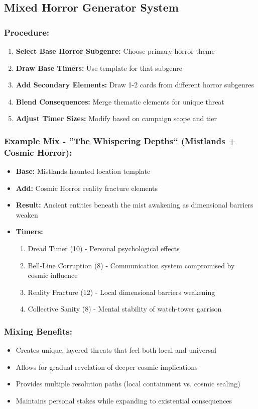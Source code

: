 \documentclass[11pt]{article}
\begin{document}
\subsection{Mixed Horror Generator System}

\subsubsection{Procedure:}
\begin{enumerate}
\item \textbf{Select Base Horror Subgenre:} Choose primary horror theme
\item \textbf{Draw Base Timers:} Use template for that subgenre
\item \textbf{Add Secondary Elements:} Draw 1-2 cards from different horror subgenres
\item \textbf{Blend Consequences:} Merge thematic elements for unique threat
\item \textbf{Adjust Timer Sizes:} Modify based on campaign scope and tier
\end{enumerate}

\subsubsection{Example Mix - ''The Whispering Depths`` (Mistlands + Cosmic Horror):}
\begin{itemize}
\item \textbf{Base:} Mistlands haunted location template
\item \textbf{Add:} Cosmic Horror reality fracture elements
\item \textbf{Result:} Ancient entities beneath the mist awakening as dimensional barriers weaken
\item \textbf{Timers:}
  \begin{enumerate}
  \item Dread Timer (10) - Personal psychological effects
  \item Bell-Line Corruption (8) - Communication system compromised by cosmic influence
  \item Reality Fracture (12) - Local dimensional barriers weakening
  \item Collective Sanity (8) - Mental stability of watch-tower garrison
  \end{enumerate}
\end{itemize}

\subsubsection{Mixing Benefits:}
\begin{itemize}
\item Creates unique, layered threats that feel both local and universal
\item Allows for gradual revelation of deeper cosmic implications
\item Provides multiple resolution paths (local containment vs. cosmic sealing)
\item Maintains personal stakes while expanding to existential consequences
\end{itemize}
\end{document}
